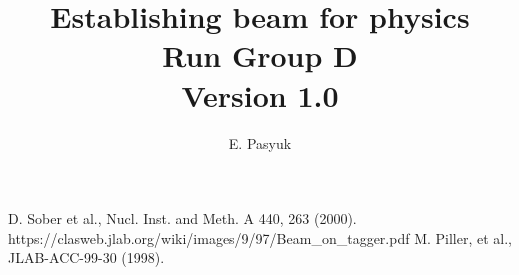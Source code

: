 \documentclass[12pt]{article}
\newcommand{\versionnumber}{1.0}
\begin{document}
\title{Establishing beam for physics \\
Run Group D\\ \normalsize \vspace{3mm} Version \versionnumber}
\author{E. Pasyuk}
\maketitle


\begin{thebibliography}{00}
 D. Sober et al., Nucl. Inst. and Meth. A 440, 263 (2000).
 https://clasweb.jlab.org/wiki/images/9/97/Beam\_on\_tagger.pdf
 M. Piller, et al., JLAB-ACC-99-30 (1998).
\end{thebibliography}
\end{document}
